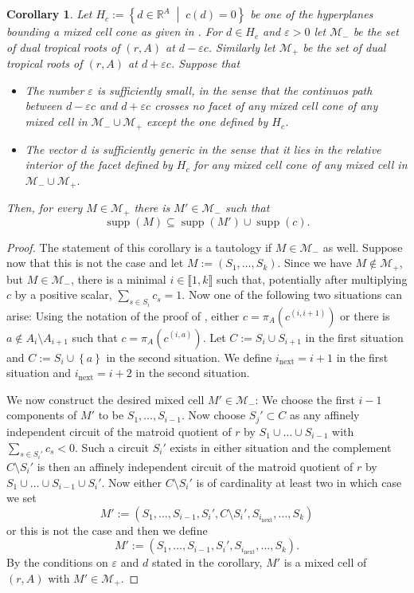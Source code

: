\documentclass[a4paper]{article}
\newtheorem{corollary}{Corollary}
\theoremstyle{remark}
\newcommand{\set}[1]{\left\{#1\right\}}
\newcommand{\setdes}[2]{\left\{#1\;\middle|\;#2\right\}}
\def\RR{\mathbb{R}}
\newcommand{\irng}[1]{\llbracket #1 \rrbracket}
\DeclareMathOperator{\supp}{supp}
\begin{document}
\begin{corollary}
  \label{cor:exchangerelation}
  Let $H_c:=\setdes{d\in \RR^A}{c(d) = 0}$ be one of the hyperplanes
  bounding a mixed cell cone as given in
  . For $d\in H_c$ and 
  $\varepsilon > 0$ let $\mathcal{M}_-$ be the set of dual tropical roots of
  $(r,A)$ at $d-\varepsilon c$. Similarly let $\mathcal{M}_+$ be the set of dual tropical
  roots of $(r,A)$ at $d + \varepsilon c$. Suppose that
  \begin{itemize}
  \item The number $\varepsilon$ is sufficiently small, in the sense that
    the continuos path between $d - \varepsilon c$ and $d + \varepsilon c$ crosses
    no facet of any mixed cell cone of any mixed cell in $\mathcal{M}_- \cup \mathcal{M}_+$
    except the one defined by $H_c$.
  \item The vector $d$ is sufficiently generic in the sense that it
    lies in the relative interior of the facet defined by $H_c$ for
    any mixed cell cone of any mixed cell in $\mathcal{M}_- \cup \mathcal{M}_+$.
  \end{itemize}

  Then, for every $M\in \mathcal{M}_+$ there is $M'\in \mathcal{M}_-$ such that
  \[\supp(M) \subseteq \supp(M') \cup \supp(c).\]
\end{corollary}
\begin{proof}
  The statement of this corollary is a tautology if
  $M\in \mathcal{M}_-$ as well.  Suppose now that this is not the case and let
  $M := (S_1,\hdots,S_k)$. Since we have $M\notin \mathcal{M}_+$, but
  $M\in \mathcal{M}_-$, there is a minimal $i\in \irng{1,k}$ such that, potentially
  after multiplying $c$ by a positive scalar,
  $\sum_{s\in S_i}c_s = 1$. Now one of the following two situations can
  arise: Using the notation of the proof of ,
  either $c = \pi_A(c^{(i,i+1)})$ or there is
  $a\notin A_i\setminus A_{i+1}$ such that $c = \pi_A(c^{(i,a)})$. Let
  $C := S_i\cup S_{i+1}$ in the first situation and
  $C := S_i\cup \set{a}$ in the second situation. We define
  $i_{\text{next}} = i+1$ in the first situation and
  $i_{\text{next}} = i + 2$ in the second situation.

  We now construct the desired mixed cell $M'\in \mathcal{M}_-$: We choose the
  first $i-1$ components of $M'$ to be $S_1,\hdots,S_{i-1}$.  Now
  choose $S_j'\subset C$ as any affinely independent circuit of the matroid
  quotient of $r$ by $S_1\cup \hdots \cup S_{i-1}$ with
  $\sum_{s\in S_i'} c_s < 0$. Such a circuit $S_i'$ exists in either
  situation and the complement $C\setminus S_i'$ is then an affinely
  independent circuit of the matroid quotient of $r$ by
  $S_1\cup \hdots \cup S_{i-1}\cup S_i'$. Now either $C\setminus S_i'$ is of
  cardinality at least two in which case we set
  \[M':= (S_1,\hdots,S_{i-1},S_i',C\setminus S_i',S_{i_{\text{next}}},\hdots,S_k)\]
  or this is not the case and then we define
  \[M':= (S_1,\hdots,S_{i-1},S_i',S_{i_{\text{next}}},\hdots,S_k).\]
  By the conditions on $\varepsilon$ and $d$ stated in the corollary,
  $M'$ is a mixed cell of $(r,A)$ with $M'\in \mathcal{M}_+$.
\end{proof}
\end{document}
